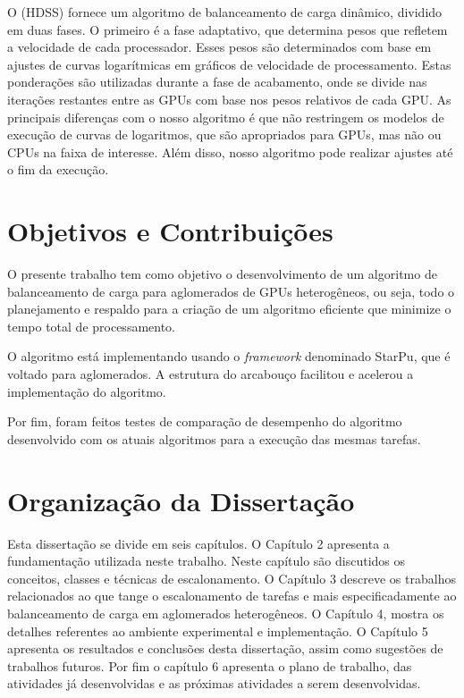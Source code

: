 O  (HDSS) \cite{HDSS} fornece um algoritmo de balanceamento de carga dinâmico, dividido em duas fases. O primeiro é a fase adaptativo, que determina pesos que refletem a velocidade de cada processador. Esses pesos são determinados com base em ajustes de curvas logarítmicas em gráficos de velocidade de processamento. Estas ponderações são utilizadas durante a fase de acabamento, onde se divide nas iterações restantes entre as GPUs com base nos pesos relativos de cada GPU. As principais diferenças com o nosso algoritmo é que não restringem os modelos de execução de curvas de logaritmos, que são apropriados para GPUs, mas não ou CPUs na faixa de interesse. Além disso, nosso algoritmo pode realizar ajustes até o fim da execução.


\section{Objetivos e Contribuições}\label{cap1:objetivos}

O presente trabalho tem como objetivo o desenvolvimento de um algoritmo de balanceamento de carga para aglomerados de GPUs heterogêneos, ou seja, todo o planejamento e respaldo para a criação de um algoritmo eficiente que minimize o tempo total de processamento.

O algoritmo está implementando usando o \textit{framework} denominado StarPu, que é voltado para aglomerados. A estrutura do arcabouço facilitou e acelerou a implementação do algoritmo.

Por fim, foram feitos testes de comparação de desempenho do algoritmo desenvolvido com os atuais algoritmos para a execução das mesmas tarefas.


\section{Organização da Dissertação}\label{cap1:organizacao}

Esta dissertação se divide em seis capítulos. O Capítulo 2 apresenta a fundamentação utilizada neste trabalho. Neste capítulo são discutidos os conceitos, classes e técnicas de escalonamento. O Capítulo 3 descreve os trabalhos relacionados ao que tange o escalonamento de tarefas e mais especificadamente ao balanceamento de carga em aglomerados heterogêneos.
O Capítulo 4, mostra os detalhes referentes ao ambiente experimental e implementação.
O Capítulo 5 apresenta os resultados e conclusões desta dissertação, assim como sugestões de trabalhos futuros.
Por fim o capítulo 6 apresenta o plano de trabalho, das atividades já desenvolvidas e as próximas atividades a serem desenvolvidas.


